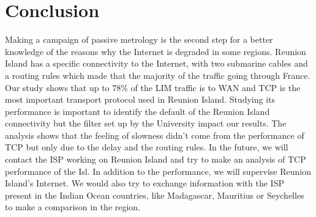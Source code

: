 \documentclass[10pt, conference, a4paper, twocolumns]{IEEEtran}
\def\yassine#1{\textbf{\textcolor{blue}{yassine : #1}}}
\begin{document}


\section{Conclusion}
\label{sec:conclusion}
Making a campaign of passive metrology is the second step for a better knowledge of the reasons why the Internet is degraded in some regions. Reunion Island has a specific connectivity to the Internet, with two submarine cables and a routing rules which made that the majority of the traffic going through France. 
Our study shows that up to 78\% of the LIM traffic is to WAN and TCP is the most important transport protocol used in Reunion Island. Studying its performance is important to identify the default of the Reunion Island connectivity but the filter set up by the University impact our results. 
The analysis shows that the feeling of slowness didn't come %
from the performance of TCP but only due to the delay and the routing rules. %
In the future, we will contact the ISP working on Reunion Island and try to make an analysis of TCP performance of the Isl. In addition to the performance, we will supervise Reunion Island's Internet. We would also try to exchange information with the ISP present in the Indian Ocean countries, like Madagascar, Mauritius or Seychelles to make a comparison in the region.

\end{document}
